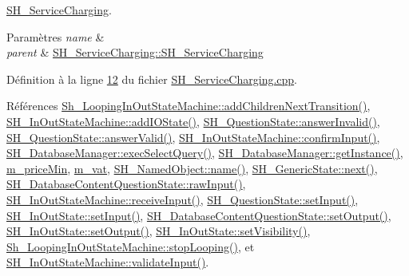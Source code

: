\hyperlink{classSH__ServiceCharging}{S\-H\-\_\-\-Service\-Charging}. 


\begin{DoxyParams}{Paramètres}
{\em name} & \\
\hline
{\em parent} & \hyperlink{classSH__ServiceCharging_afa5273d046049b1c2b020a6a19a8290b}{S\-H\-\_\-\-Service\-Charging\-::\-S\-H\-\_\-\-Service\-Charging} \\
\hline
\end{DoxyParams}


Définition à la ligne \hyperlink{SH__ServiceCharging_8cpp_source_l00012}{12} du fichier \hyperlink{SH__ServiceCharging_8cpp_source}{S\-H\-\_\-\-Service\-Charging.\-cpp}.



Références \hyperlink{classSh__LoopingInOutStateMachine_acfd8d0711c793b13c759f6c50be6a315}{Sh\-\_\-\-Looping\-In\-Out\-State\-Machine\-::add\-Children\-Next\-Transition()}, \hyperlink{classSH__InOutStateMachine_ad6b778d052f741daee720c047059ce0e}{S\-H\-\_\-\-In\-Out\-State\-Machine\-::add\-I\-O\-State()}, \hyperlink{classSH__QuestionState_a3348a8a683130678ac87a10ba2a25486}{S\-H\-\_\-\-Question\-State\-::answer\-Invalid()}, \hyperlink{classSH__QuestionState_a04e259643788d15ab6244bc8a04286d6}{S\-H\-\_\-\-Question\-State\-::answer\-Valid()}, \hyperlink{classSH__InOutStateMachine_a0fb4c4d63ccb19df48f1e060d02d8ae3}{S\-H\-\_\-\-In\-Out\-State\-Machine\-::confirm\-Input()}, \hyperlink{classSH__DatabaseManager_ab8f9850cb68444ab9a4e613b36a3b044}{S\-H\-\_\-\-Database\-Manager\-::exec\-Select\-Query()}, \hyperlink{classSH__DatabaseManager_a638369a15265ab0aa053080a32d2ca39}{S\-H\-\_\-\-Database\-Manager\-::get\-Instance()}, \hyperlink{classSH__ServiceCharging_a44584a7ff1edd6ae03c4f77544136c13}{m\-\_\-price\-Min}, \hyperlink{classSH__ServiceCharging_ae2fa75c56883dc4af6b0bbcbb86d0861}{m\-\_\-vat}, \hyperlink{classSH__NamedObject_a970f265df31b28b2179bbbceb6170ac2}{S\-H\-\_\-\-Named\-Object\-::name()}, \hyperlink{classSH__GenericState_a030e67a872956135c52e6876d960a7b5}{S\-H\-\_\-\-Generic\-State\-::next()}, \hyperlink{classSH__DatabaseContentQuestionState_a344d9109e15509506b1b998d28392cac}{S\-H\-\_\-\-Database\-Content\-Question\-State\-::raw\-Input()}, \hyperlink{classSH__InOutStateMachine_ab224e4a6ab99c15770bc63e1b8fdb771}{S\-H\-\_\-\-In\-Out\-State\-Machine\-::receive\-Input()}, \hyperlink{classSH__QuestionState_a331222d371d9c97392f35c84a5ef43e1}{S\-H\-\_\-\-Question\-State\-::set\-Input()}, \hyperlink{classSH__InOutState_a0206ab7d5616f28b0da7bfd5451614e8}{S\-H\-\_\-\-In\-Out\-State\-::set\-Input()}, \hyperlink{classSH__DatabaseContentQuestionState_aff932cdd7974baeea9a477cf0abc5ace}{S\-H\-\_\-\-Database\-Content\-Question\-State\-::set\-Output()}, \hyperlink{classSH__InOutState_a7dc244d72e09fdbc30eb3a704b05a4d8}{S\-H\-\_\-\-In\-Out\-State\-::set\-Output()}, \hyperlink{classSH__InOutState_a7706a2ea1367ab3416db27fa0f4794f7}{S\-H\-\_\-\-In\-Out\-State\-::set\-Visibility()}, \hyperlink{classSh__LoopingInOutStateMachine_a8788fa9e4c3149bcf7554e2a2b960c51}{Sh\-\_\-\-Looping\-In\-Out\-State\-Machine\-::stop\-Looping()}, et \hyperlink{classSH__InOutStateMachine_a5a5804bd32a04d25926f6e323b906887}{S\-H\-\_\-\-In\-Out\-State\-Machine\-::validate\-Input()}.


